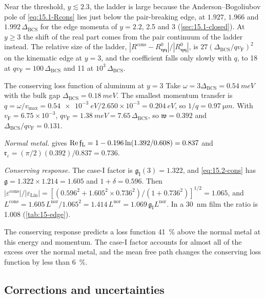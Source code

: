 Near the threshold, $y \lesssim 2.3$, the ladder is large because the Anderson--Bogoliubov pole of \cref{eq:15.1-Rcons} lies just below the pair-breaking edge, at $1.927$, $1.966$ and $1.992\,\Delta_{\mathrm{BCS}}$ for the edge momenta of $y = 2.2$, 2.5 and 3 (\cref{sec:15.1-closed}). At $y \ge 3$ the shift of the real part comes from the pair continuum of the ladder instead. The relative size of the ladder, $|R^{\mathrm{cons}} - R^0_{\boldsymbol{\eta}\boldsymbol{\eta}}|/|R^0_{\boldsymbol{\eta}\boldsymbol{\eta}}|$, is $27(\Delta_{\mathrm{BCS}}/qv_{\mathrm{F}})^2$ on the kinematic edge at $y = 3$, and the coefficient falls only slowly with $q$, to 18 at $qv_{\mathrm{F}} = 100\,\Delta_{\mathrm{BCS}}$ and 11 at $10^3\,\Delta_{\mathrm{BCS}}$.

\begin{workedexample}{The conserving loss function of aluminum at $y = 3$}\label{we:15-edge}
Take $\omega = 3\Delta_{\mathrm{BCS}} = \SI{0.54}{meV}$ with the bulk gap $\Delta_{\mathrm{BCS}} = \SI{0.18}{meV}$. The smallest momentum transfer is $q = \omega/v_{\mathrm{max}} = \SI{0.54e-3}{eV}/2.650\times10^{-3} = \SI{0.204}{eV}$, so $1/q = \SI{0.97}{\micro m}$. With $v_{\mathrm{F}} = 6.75\times10^{-3}$, $qv_{\mathrm{F}} = \SI{1.38}{meV} = 7.65\,\Delta_{\mathrm{BCS}}$, so $\mathfrak{w} = 0.392$ and $\Delta_{\mathrm{BCS}}/qv_{\mathrm{F}} = 0.131$.

\emph{Normal metal.}  gives $\operatorname{Re}\mathfrak{f}_{\mathrm{L}} = 1 - 0.196\ln(1.392/0.608) = 0.837$ and $\mathfrak{r}_\varepsilon = (\pi/2)(0.392)/0.837 = 0.736$.

\emph{Conserving response.} The case-I factor is $\mathfrak{g}_{\mathrm{I}}(3) = 1.322$, and \cref{eq:15.2-cons} has $\mathfrak{g} = 1.322\times1.214 = 1.605$ and $1 + \delta = 0.596$. Then $|\varepsilon^{\mathrm{cons}}|/|\varepsilon_{\mathrm{Lin}}| = [(0.596^2 + 1.605^2\times0.736^2)/(1 + 0.736^2)]^{1/2} = 1.065$, and $L^{\mathrm{cons}} = 1.605\,L^{\mathrm{nor}}/1.065^2 = 1.414\,L^{\mathrm{nor}} = 1.069\,\mathfrak{g}_{\mathrm{I}}L^{\mathrm{nor}}$. In a \SI{30}{nm} film the ratio is 1.008 (\cref{tab:15-edge}).

The conserving response predicts a loss function \SI{41}{\percent} above the normal metal at this energy and momentum. The case-I factor accounts for almost all of the excess over the normal metal, and the mean free path changes the conserving loss function by less than \SI{6}{\percent}.
\end{workedexample}

\subsection{Corrections and uncertainties}\label{sec:15.2-nuisance}

